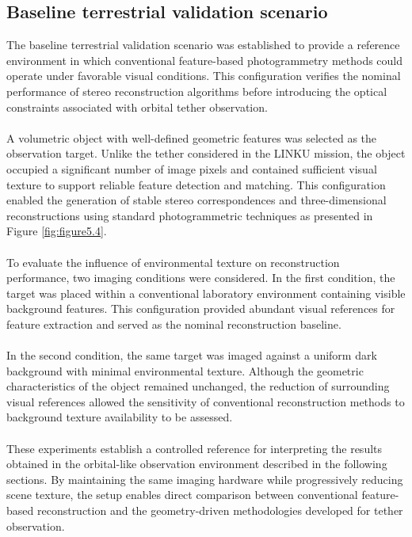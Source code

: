 \subsection{Baseline terrestrial validation scenario}
The baseline terrestrial validation scenario was established to provide a reference environment in which conventional feature-based photogrammetry methods could operate under favorable visual conditions. This configuration verifies the nominal performance of stereo reconstruction algorithms before introducing the optical constraints associated with orbital tether observation.
\\\\
A volumetric object with well-defined geometric features was selected as the observation target. Unlike the tether considered in the LINKU mission, the object occupied a significant number of image pixels and contained sufficient visual texture to support reliable feature detection and matching. This configuration enabled the generation of stable stereo correspondences and three-dimensional reconstructions using standard photogrammetric techniques as presented in Figure \ref{fig:figure5.4}.
\\\\
To evaluate the influence of environmental texture on reconstruction performance, two imaging conditions were considered. In the first condition, the target was placed within a conventional laboratory environment containing visible background features. This configuration provided abundant visual references for feature extraction and served as the nominal reconstruction baseline.
\\\\
In the second condition, the same target was imaged against a uniform dark background with minimal environmental texture. Although the geometric characteristics of the object remained unchanged, the reduction of surrounding visual references allowed the sensitivity of conventional reconstruction methods to background texture availability to be assessed.
\\\\
These experiments establish a controlled reference for interpreting the results obtained in the orbital-like observation environment described in the following sections. By maintaining the same imaging hardware while progressively reducing scene texture, the setup enables direct comparison between conventional feature-based reconstruction and the geometry-driven methodologies developed for tether observation.
\newpage
\clearpage

